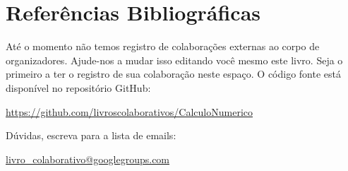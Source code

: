 \documentclass[12pt]{book}
\begin{document}
\nocite{*}


\begingroup
\chapter*{Referências Bibliográficas}
\renewcommand{\chapter}[2]{}

\endgroup

\begingroup
\chapter*{Colaboradores}
\renewcommand{\chapter}[2]{}
Até o momento não temos registro de colaborações externas ao corpo de organizadores. Ajude-nos a mudar isso editando você mesmo este livro. Seja o primeiro a ter o registro de sua colaboração neste espaço. O código fonte está disponível no repositório GitHub:
\begin{center}
  \url{https://github.com/livroscolaborativos/CalculoNumerico}
\end{center}
Dúvidas, escreva para a lista de emails:
\begin{center}
  \url{livro_colaborativo@googlegroups.com}
\end{center}
\endgroup


\clearpage
{}
\printindex
\end{document}
